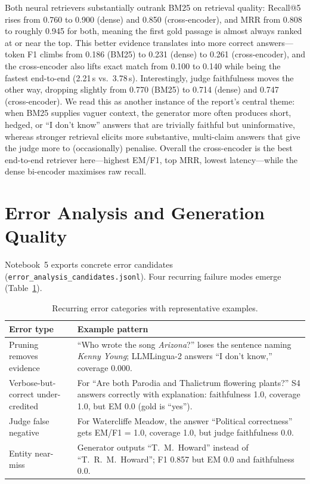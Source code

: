 \documentclass[runningheads]{llncs}
\begin{document}
Both neural retrievers substantially outrank BM25 on retrieval quality:
Recall@5 rises from 0.760 to 0.900 (dense) and 0.850 (cross-encoder), and MRR
from 0.808 to roughly 0.945 for both, meaning the first gold passage is almost
always ranked at or near the top. This better evidence translates into more
correct answers---token F1 climbs from 0.186 (BM25) to 0.231 (dense) to 0.261
(cross-encoder), and the cross-encoder also lifts exact match from 0.100 to
0.140 while being the fastest end-to-end (2.21\,s vs.\ 3.78\,s). Interestingly,
judge faithfulness moves the other way, dropping slightly from 0.770 (BM25) to
0.714 (dense) and 0.747 (cross-encoder). We read this as another instance of the
report's central theme: when BM25 supplies vaguer context, the generator more
often produces short, hedged, or ``I don't know'' answers that are trivially
faithful but uninformative, whereas stronger retrieval elicits more substantive,
multi-claim answers that give the judge more to (occasionally) penalise. Overall
the cross-encoder is the best end-to-end retriever here---highest EM/F1, top MRR,
lowest latency---while the dense bi-encoder maximises raw recall.

\section{Error Analysis and Generation Quality}

Notebook~5 exports concrete error candidates
(\texttt{error\_analysis\_candidates.jsonl}). Four recurring failure modes
emerge (Table~\ref{tab:errors}).

\begin{table}[t]
\centering
\caption{Recurring error categories with representative examples.}\label{tab:errors}
\begin{tabular}{p{}p{}}
\toprule
\textbf{Error type} & \textbf{Example pattern}\\
\midrule
Pruning removes evidence &
``Who wrote the song \emph{Arizona}?'' loses the sentence naming
\emph{Kenny Young}; LLMLingua-2 answers ``I don't know,'' coverage 0.000.\\
Verbose-but-correct under-credited &
For ``Are both Parodia and Thalictrum flowering plants?'' S4 answers
correctly with explanation: faithfulness 1.0, coverage 1.0, but EM 0.0
(gold is ``yes'').\\
Judge false negative &
For Watercliffe Meadow, the answer ``Political correctness'' gets
EM/F1 = 1.0, coverage 1.0, but judge faithfulness 0.0.\\
Entity near-miss &
Generator outputs ``T.\ M.\ Howard'' instead of ``T.\ R.\ M.\ Howard'';
F1 0.857 but EM 0.0 and faithfulness 0.0.\\
\bottomrule
\end{tabular}
\end{table}
\end{document}
